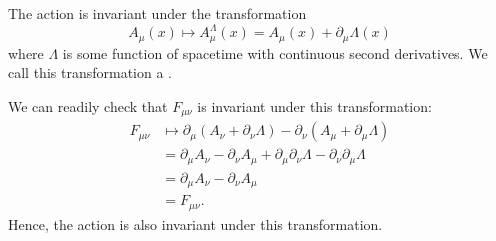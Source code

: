 \documentclass[fleqn]{NotesClass}
\begin{document}
    The action is invariant under the transformation
    \begin{equation}
        A_\mu(x) \mapsto A_\mu^\Lambda(x) = A_\mu(x) + \partial_\mu \Lambda(x)
    \end{equation}
    where \(\Lambda\) is some function of spacetime with continuous second derivatives.
    We call this transformation a .
    
    We can readily check that \(F_{\mu\nu}\) is invariant under this transformation:
    \begin{align}
        F_{\mu\nu} &\mapsto \partial_\mu(A_\nu + \partial_\nu \Lambda) - \partial_\nu(A_\mu + \partial_\mu \Lambda)\\
        &= \partial_\mu A_\nu - \partial_\nu A_\mu + \partial_\mu\partial_\nu \Lambda - \partial_\nu\partial_\mu \Lambda\\
        &= \partial_\mu A_\nu - \partial_\nu A_\mu\\
        &= F_{\mu\nu}.
    \end{align}
    Hence, the action is also invariant under this transformation.
    
\end{document}
